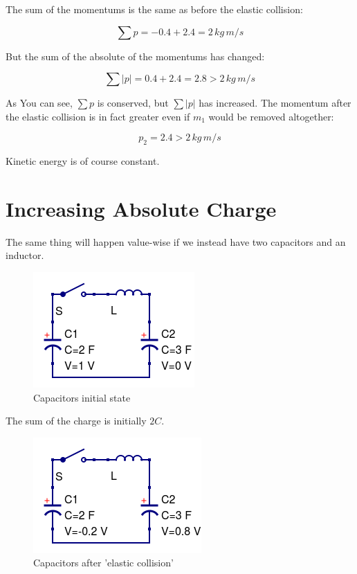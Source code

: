 The sum of the momentums is the same as before the elastic collision:

\begin{equation}
\sum p = -0.4 + 2.4 = 2 \, kg \, m/s
\end{equation}

But the sum of the absolute of the momentums has changed:

\begin{equation}
\sum | p | = 0.4 + 2.4 = 2.8 > 2 \, kg \, m/s
\end{equation}

As You can see, $\sum p$ is conserved, but $\sum | p |$ has increased.
The momentum after the elastic collision is in fact greater even if $m_1$ would be removed altogether:

\begin{equation}
p_2 = 2.4 > 2 \, kg \, m/s
\end{equation}

Kinetic energy is of course constant.
 
\section{Increasing Absolute Charge}

The same thing will happen value-wise if we instead have two capacitors and an inductor.

\begin{figure}[ht] \centering
	\includegraphics[scale=.5]{ccl7} \caption{Capacitors initial state}
\end{figure}

The sum of the charge is initially $2 C$.

\begin{figure}[ht] \centering
	\includegraphics[scale=.5]{ccl8} \caption{Capacitors after 'elastic collision'}
\end{figure}

